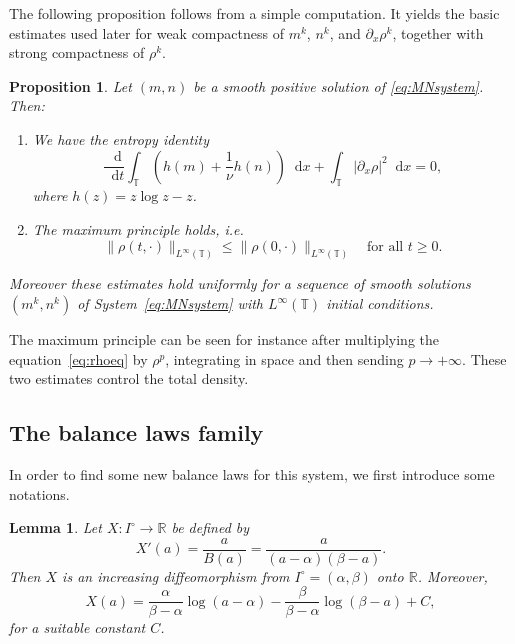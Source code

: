\documentclass[a4paper,twosided,11pt]{article}
\newcommand{\R}{\mathbb{R}}
\newcommand{\T}{\mathbb{T}}
\newcommand{\al}{\alpha}
\newcommand{\be}{\beta}
\newcommand{\1}{\mathbf{1}}
\theoremstyle{plain}
\newtheorem{lemma}[thm]{Lemma}
\newtheorem{proposition}[thm]{Proposition}
\theoremstyle{remark}
\newcommand{\diff}{\mathop{} \mathrm{d}}
\numberwithin{equation}{section}
\begin{document}
The following proposition follows from a simple computation. It yields the basic estimates used later for weak compactness of $m^k$, $n^k$, and $\partial_x\rho^k$, together with strong compactness of $\rho^k$.



\begin{proposition}
\label{prop:basic-identities}
Let $(m,n)$ be a smooth positive solution of \eqref{eq:MNsystem}. Then:
\begin{enumerate}[label=(\roman*),leftmargin=2.4em]
\item We have the entropy identity
\begin{equation}
\label{eq:basic-entropy}
\frac{\diff}{\diff t}
\int_{\T}\left(h(m)+\frac1\nu h(n)\right) \diff x
+
\int_{\T}| \partial_x\rho|^2 \diff x=0,
\end{equation}
where $h(z)=z\log z-z$.
\item The maximum principle holds, i.e.
\begin{equation}
\label{eq:maxprinciple-rho}
 \|\rho(t,\cdot)\|_{L^\infty(\T)}\leq \|\rho(0,\cdot)\|_{L^\infty(\T)}
 \quad \text{for all } t\ge 0.
\end{equation}
\end{enumerate}
Moreover these estimates hold uniformly for a sequence of smooth solutions $(m^k, n^k)$ of System~\eqref{eq:MNsystem} with $L^{\infty}(\T)$ initial conditions.
\end{proposition}


The maximum principle can be seen for instance after multiplying the equation~\eqref{eq:rhoeq} by $\rho^p$, integrating in space and then sending $p\to +\infty$. These two estimates control the total density. 


\subsection{The balance laws family}

In order to find some new balance laws for this system, we first introduce some notations.

\begin{lemma}
\label{lem:X-transform}
Let $X:I^\circ\to\R$ be defined by
\begin{equation}
\label{eq:defX}
 X'(a)=\frac{a}{B(a)}=\frac{a}{(a-\al)(\be-a)}.
\end{equation}
Then $X$ is an increasing diffeomorphism from $I^\circ=(\al,\be)$ onto $\R$. Moreover,
\begin{equation*}
 X(a)=\frac{\al}{\be-\al}\log(a-\al)-\frac{\be}{\be-\al}\log(\be-a)+C,
\end{equation*}
for a suitable constant $C$.
\end{lemma}
\end{document}
